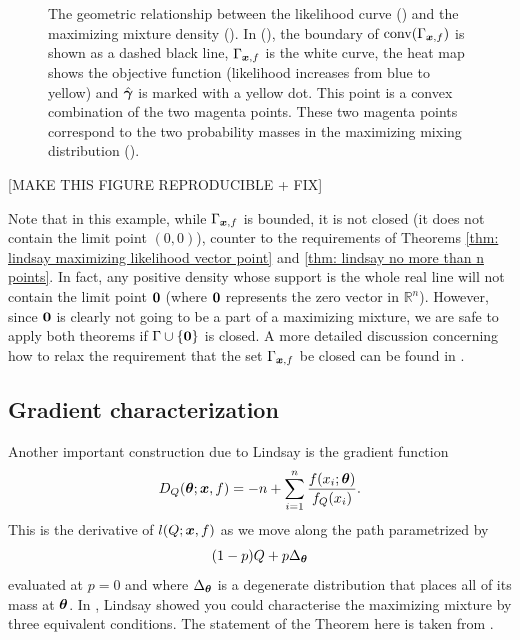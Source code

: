 \begin{figure}[ht]
\begin{minipage}{0.5\textwidth}
			\end{minipage}
			\caption[The geometric relationship between the likelihood curve () and the maximizing mixture density ().]{The geometric relationship between the likelihood curve () and the maximizing mixture density (). In (), the boundary of $\mathrm{conv}(\Gamma_{{\bm{{x}}}, f})$ is shown as a dashed black line, $\Gamma_{{\bm{{x}}}, f}$ is the white curve, the heat map  shows the objective function (likelihood increases from blue to yellow) and $\hat{{\bm{{\gamma}}}}$ is marked with a yellow dot. This point is a convex combination of the two magenta points. These two magenta points correspond to the two probability masses in the maximizing mixing distribution ().}
			\label{fig:GammaSol}
		\end{figure}

		[MAKE THIS FIGURE REPRODUCIBLE + FIX]

		\begin{remark}
			Note that in this example, while $\Gamma_{{\bm{{x}}}, f}$ is bounded, it is not closed (it does not contain the limit point $(0,0)$), counter to the requirements of Theorems \ref{thm: lindsay maximizing likelihood vector point} and \ref{thm: lindsay no more than n points}. In fact, any positive density whose support is the whole real line will not contain the limit point ${\bm{{0}}}$ (where ${\bm{{0}}}$ represents the zero vector in $\mathbb{R}^n$). However, since ${\bm{{0}}}$ is clearly not going to be a part of a maximizing mixture, we are safe to apply both theorems if $\Gamma \cup \{ {\bm{{0}}} \}$ is closed. A more detailed discussion concerning how to relax the requirement that the set $\Gamma_{{\bm{{x}}},f}$ be closed can be found in \cite[Section 5.2.2.]{Lindsay1995-sq}.
		\end{remark}

	\subsection{Gradient characterization}
	Another important construction due to Lindsay is the gradient function
	\begin{equation}
		D_Q({\bm{{\theta}}}; {\bm{{x}}}, f) = -n + \sum_{i = 1}^n \frac{f(x_i;{\bm{{\theta}}})}{f_Q(x_i)}.
	\end{equation}
	This is the derivative of $l(Q;{\bm{{x}}},f)$ as we move along the path parametrized by
	\begin{equation}
		(1 - p)Q + p\Delta_{\bm{{\theta}}}
	\end{equation}
	evaluated at $p = 0$ and where $\Delta_{\bm{{\theta}}}$ is a degenerate distribution that places all of its mass at ${\bm{{\theta}}}$. In \cite[Theorem 4.1]{Lindsay1983-tf}, Lindsay showed you could characterise the maximizing mixture by three equivalent conditions. The statement of the Theorem here is taken from \cite[Theorem 19]{Lindsay1995-sq}.

